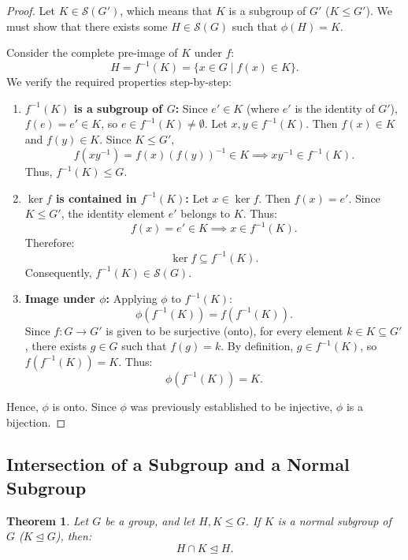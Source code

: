 \documentclass[12pt]{article}
\theoremstyle{definition}
\theoremstyle{plain}
\newtheorem{theorem}{Theorem}[section]
\begin{document}
\begin{proof}
Let $K \in \mathcal{S}(G')$, which means that $K$ is a subgroup of $G'$ ($K \le G'$).
We must show that there exists some $H \in \mathcal{S}(G)$ such that $\phi(H) = K$.

Consider the complete pre-image of $K$ under $f$:
\[
H = f^{-1}(K) = \{ x \in G \mid f(x) \in K \}.
\]
We verify the required properties step-by-step:
\begin{enumerate}
    \item \textbf{$f^{-1}(K)$ is a subgroup of $G$:}
    Since $e' \in K$ (where $e'$ is the identity of $G'$), $f(e) = e' \in K$, so $e \in f^{-1}(K) \neq \emptyset$.
    Let $x, y \in f^{-1}(K)$. Then $f(x) \in K$ and $f(y) \in K$. Since $K \le G'$,
    \[
    f(x y^{-1}) = f(x) (f(y))^{-1} \in K \implies x y^{-1} \in f^{-1}(K).
    \]
    Thus, $f^{-1}(K) \le G$.
    
    \item \textbf{$\ker f$ is contained in $f^{-1}(K)$:}
    Let $x \in \ker f$. Then $f(x) = e'$.
    Since $K \le G'$, the identity element $e'$ belongs to $K$.
    Thus:
    \[
    f(x) = e' \in K \implies x \in f^{-1}(K).
    \]
    Therefore:
    \[
    \ker f \subseteq f^{-1}(K).
    \]
    Consequently, $f^{-1}(K) \in \mathcal{S}(G)$.
    
    \item \textbf{Image under $\phi$:}
    Applying $\phi$ to $f^{-1}(K)$:
    \[
    \phi(f^{-1}(K)) = f(f^{-1}(K)).
    \]
    Since $f: G \to G'$ is given to be surjective (onto), for every element $k \in K \subseteq G'$, there exists $g \in G$ such that $f(g) = k$. By definition, $g \in f^{-1}(K)$, so $f(f^{-1}(K)) = K$.
    Thus:
    \[
    \phi(f^{-1}(K)) = K.
    \]
\end{enumerate}
Hence, $\phi$ is onto. Since $\phi$ was previously established to be injective, $\phi$ is a bijection.
\end{proof}

\subsection{Intersection of a Subgroup and a Normal Subgroup}

\begin{theorem}
Let $G$ be a group, and let $H, K \le G$. If $K$ is a normal subgroup of $G$ ($K \trianglelefteq G$), then:
\[
H \cap K \trianglelefteq H.
\]
\end{theorem}
\end{document}

